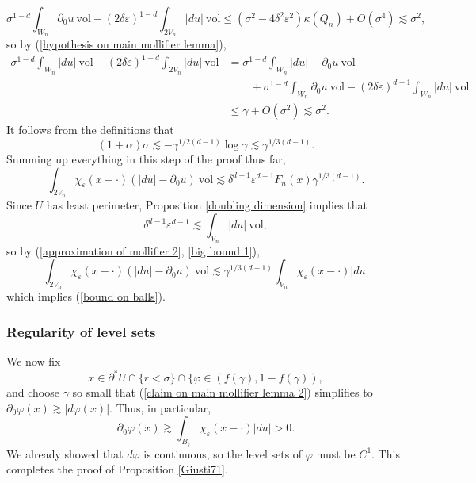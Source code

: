 \documentclass[reqno,12pt,letterpaper]{amsart}
\newcommand{\vol}{\mathrm{vol}}
\theoremstyle{definition}
\numberwithin{equation}{section}
\begin{document}
$$\sigma^{1 - d} \int_{W_n} \partial_0 u ~\vol - (2\delta\varepsilon)^{1 - d} \int_{2V_n} |du| ~\vol \leq (\sigma^2 -4\delta^2\varepsilon^2) \kappa(Q_n) + O(\sigma^4) \lesssim \sigma^2,$$
so by (\ref{hypothesis on main mollifier lemma}),
\begin{align*}
\sigma^{1 - d} \int_{W_n} |du| ~\vol - (2\delta\varepsilon)^{1 - d} \int_{2V_n} |du| ~\vol &= \sigma^{1 - d} \int_{W_n} |du| - \partial_0u ~\vol \\
&\qquad + \sigma^{1 - d} \int_{W_n} \partial_0u ~\vol - (2\delta\varepsilon)^{d - 1} \int_{W_n} |du| ~\vol \\
&\leq \gamma + O(\sigma^2) \lesssim \sigma^2.
\end{align*}
It follows from the definitions that
$$(1 + \alpha)\sigma \lesssim -\gamma^{1/2(d - 1)} \log \gamma \lesssim \gamma^{1/3(d - 1)}.$$
Summing up everything in this step of the proof thus far,
\begin{equation}\label{big bound 1}
\int_{2V_n} \chi_\varepsilon(x - \cdot)(|du| - \partial_0u) ~\vol \lesssim \delta^{d - 1} \varepsilon^{d - 1} F_n(x) \gamma^{1/3(d - 1)}.
\end{equation}
Since $U$ has least perimeter, Proposition \ref{doubling dimension} implies that
$$\delta^{d - 1} \varepsilon^{d - 1} \lesssim \int_{V_n} |du| ~\vol,$$
so by (\ref{approximation of mollifier 2}, \ref{big bound 1}),
$$\int_{2V_n} \chi_\varepsilon(x - \cdot)(|du| - \partial_0u) ~\vol \lesssim \gamma^{1/3(d - 1)} \int_{V_n} \chi_\varepsilon(x - \cdot)|du|$$
which implies (\ref{bound on balls}).

\subsubsection{Regularity of level sets}
We now fix
$$x \in \partial^* U \cap \{r < \sigma\} \cap \{\varphi \in (f(\gamma), 1 - f(\gamma)),$$
and choose $\gamma$ so small that (\ref{claim on main mollifier lemma 2}) simplifies to $\partial_0 \varphi(x) \gtrsim |d\varphi(x)|$.
Thus, in particular,
$$\partial_0 \varphi(x) \gtrsim \int_{B_\varepsilon} \chi_\varepsilon(x - \cdot) |du| > 0.$$
We already showed that $d\varphi$ is continuous, so the level sets of $\varphi$ must be $C^1$.
This completes the proof of Proposition \ref{Giusti71}.

\end{document}
